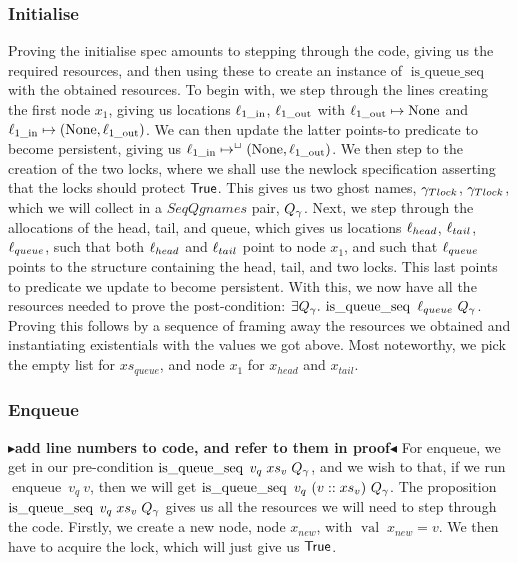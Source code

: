 \documentclass[twoside,11pt,openright]{report}
\newcommand{\enqueue}{\operatorname{enqueue}}
\newcommand{\isqueueseq}{\operatorname{is\_queue\_seq}}
\newcommand{\locin}[1]{\loc_{#1\_\text{in}}}
\newcommand{\locout}[1]{\loc_{#1\_\text{out}}}
\newcommand{\nVal}[1]{\operatorname{val} \; #1}
\newcommand{\todo}[1]{{\color[rgb]{.5,0,0}\textbf{$\blacktriangleright$#1$\blacktriangleleft$}}}
\begin{document}
\subsubsection{Initialise}
Proving the initialise spec amounts to stepping through the code, giving us the required resources, and then using these to create an instance of $\isqueueseq$ with the obtained resources. To begin with, we step through the lines creating the first node $x_1$, giving us locations $\locin{1}$, $\locout{1}$ with $\locout{1} \mapsto \None$ and $\locin{1} \mapsto (\None, \locout{1})$. We can then update the latter points-to predicate to become persistent, giving us $\locin{1} \mapsto^{\persistently} (\None, \locout{1})$. We then step to the creation of the two locks, where we shall use the newlock specification asserting that the locks should protect $\textsf{True}$. This gives us two ghost names, $\gamma_{Tlock}$, $\gamma_{Tlock}$, which we will collect in a $SeqQgnames$ pair, $Q_\gamma$.
Next, we step through the allocations of the head, tail, and queue, which gives us locations $\ell_{head}$, $\ell_{tail}$, $\ell_{queue}$, such that both $\ell_{head}$ and $\ell_{tail}$ point to node $x_1$, and such that $\ell_{queue}$ points to the structure containing the head, tail, and two locks. This last points to predicate we update to become persistent.
With this, we now have all the resources needed to prove the post-condition: $\Exists Q_\gname . \isqueueseq \ \loc_{queue} \ Q_\gname$. Proving this follows by a sequence of framing away the resources we obtained and instantiating existentials with the values we got above. Most noteworthy, we pick the empty list for $xs_{queue}$, and node $x_1$ for $x_{head}$ and $x_{tail}$.


\subsubsection{Enqueue}
\todo{add line numbers to code, and refer to them in proof}
For enqueue, we get in our pre-condition $\isqueueseq \; v_q \; xs_v \; Q_\gname$, and we wish to that, if we run $\enqueue\ v_q\ v$, then we will get $\isqueueseq\ v_q\ (v :: xs_v)\ Q_\gname$. The proposition $\isqueueseq \; v_q \; xs_v \; Q_\gname$ gives us all the resources we will need to step through the code.
Firstly, we create a new node, node $x_{new}$, with $\nVal{x_{new}} = v$.
We then have to acquire the lock, which will just give us $\textsf{True}$.
\end{document}
